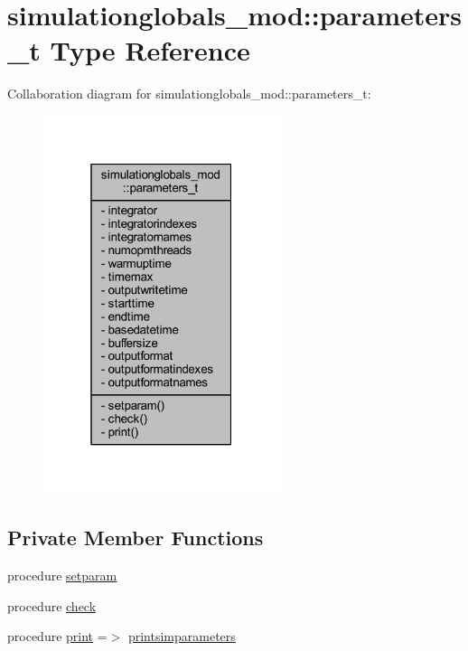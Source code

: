 \hypertarget{structsimulationglobals__mod_1_1parameters__t}{}\section{simulationglobals\+\_\+mod\+:\+:parameters\+\_\+t Type Reference}
\label{structsimulationglobals__mod_1_1parameters__t}


Collaboration diagram for simulationglobals\+\_\+mod\+:\+:parameters\+\_\+t\+:
\nopagebreak
\begin{figure}[H]
\begin{center}
\leavevmode
\includegraphics[width=196pt]{structsimulationglobals__mod_1_1parameters__t__coll__graph}
\end{center}
\end{figure}
\subsection*{Private Member Functions}
\begin{DoxyCompactItemize}
\item 
procedure \mbox{\hyperlink{structsimulationglobals__mod_1_1parameters__t_a247d15eba9f019e79c02b2be9a22ad86}{setparam}}
\item 
procedure \mbox{\hyperlink{structsimulationglobals__mod_1_1parameters__t_a7e20edb4525a73f679bd1175c9b9b399}{check}}
\item 
procedure \mbox{\hyperlink{structsimulationglobals__mod_1_1parameters__t_a3ffbed4e006d02030a0f863b5194d183}{print}} =$>$ \mbox{\hyperlink{namespacesimulationglobals__mod_ab67964fe7c3fb20a4ce0b4193520aa1d}{printsimparameters}}
\end{DoxyCompactItemize}

